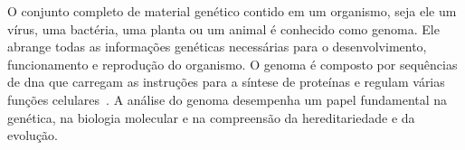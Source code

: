 O conjunto completo de material genético contido em um organismo, seja ele um vírus, uma bactéria, uma planta ou um animal é conhecido como genoma. Ele abrange todas as informações genéticas necessárias para o desenvolvimento, funcionamento e reprodução do organismo. O genoma é composto por sequências de \gls{dna} que carregam as instruções para a síntese de proteínas e regulam várias funções celulares~\cite{alberts_biologia_2017,genetics_benjamin_2016}. A análise do genoma desempenha um papel fundamental na genética, na biologia molecular e na compreensão da hereditariedade e da evolução.~\cite{alberts_biologia_2017}

